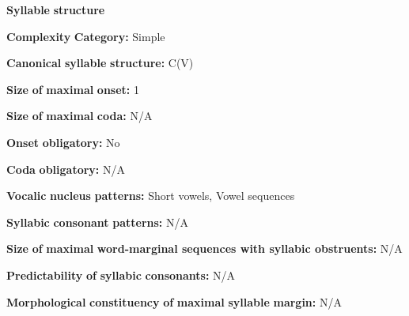 \documentclass[output=paper]{langsci/langscibook}
\begin{document}
\begin{styleBody}
\textbf{Syllable} \textbf{structure}
\end{styleBody}

\begin{styleBody}
\textbf{Complexity} \textbf{Category:} Simple
\end{styleBody}

\begin{styleBody}
\textbf{Canonical} \textbf{syllable} \textbf{structure:} C(V) \citep[163-7]{Chacon2012}
\end{styleBody}

\begin{styleBody}
\textbf{Size} \textbf{of} \textbf{maximal} \textbf{onset:} 1
\end{styleBody}

\begin{styleBody}
\textbf{Size} \textbf{of} \textbf{maximal} \textbf{coda:} N/A
\end{styleBody}

\begin{styleBody}
\textbf{Onset} \textbf{obligatory:} No
\end{styleBody}

\begin{styleBody}
\textbf{Coda} \textbf{obligatory:} N/A
\end{styleBody}

\begin{styleBody}
\textbf{Vocalic} \textbf{nucleus} \textbf{patterns:} Short vowels, Vowel sequences
\end{styleBody}

\begin{styleBody}
\textbf{Syllabic} \textbf{consonant} \textbf{patterns:} N/A
\end{styleBody}

\begin{styleBody}
\textbf{Size} \textbf{of} \textbf{maximal} \textbf{word{}-marginal sequences with syllabic obstruents:} N/A
\end{styleBody}

\begin{styleBody}
\textbf{Predictability} \textbf{of} \textbf{syllabic} \textbf{consonants:} N/A
\end{styleBody}

\begin{styleBody}
\textbf{Morphological} \textbf{constituency} \textbf{of} \textbf{maximal} \textbf{syllable} \textbf{margin:} N/A
\end{styleBody}
\end{document}
